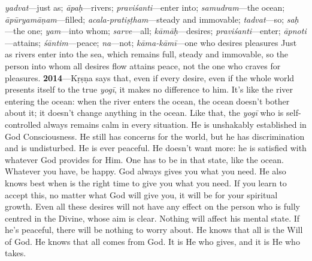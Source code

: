 {%
  \textit{yadvat}---just as; 
  \textit{āpaḥ}---rivers; 
  \textit{praviśanti}---enter into; 
  \textit{samudram}---the ocean; 
  \textit{āpūryamāṇam}---filled; 
  \textit{acala-pratiṣṭham}---steady and immovable; 
  \textit{tadvat}---so; 
  \textit{saḥ}---the one; 
  \textit{yam}---into whom; 
  \textit{sarve}---all; 
  \textit{kāmāḥ}---desires; 
  \textit{praviśanti}---enter; 
  \textit{āpnoti}---attains; 
  \textit{śāntim}---peace; 
  \textit{na}---not; 
  \textit{kāma-kāmī}---one who desires pleasures
}
{%
  Just as rivers enter into the sea, which remains full, steady and immovable, so the person into whom all desires flow attains peace, not the one who craves for pleasures.
}
\textbf{2014}---Kṛṣṇa says that, even if every desire, even if the whole world presents itself to the true \textit{yogī}, it makes no difference to him. It’s like the river entering the ocean: when the river enters the ocean, the ocean doesn’t bother about it; it doesn’t change anything in the ocean. Like that, the \textit{yogī} who is self-controlled always remains calm in every situation. He is unshakably established in God Consciousness. He still has concerns for the world, but he has discrimination and is undisturbed. He is ever peaceful. He doesn’t want more: he is satisfied with whatever God provides for Him. One has to be in that state, like the ocean. Whatever you have, be happy. God always gives you what you need. He also knows best when is the right time to give you what you need. If you learn to accept this, no matter what God will give you, it will be for your spiritual growth. Even all these desires will not have any effect on the person who is fully centred in the Divine, whose aim is clear. Nothing will affect his mental state. If he’s peaceful, there will be nothing to worry about. He knows that all is the Will of God. He knows that all comes from God. It is He who gives, and it is He who takes.

